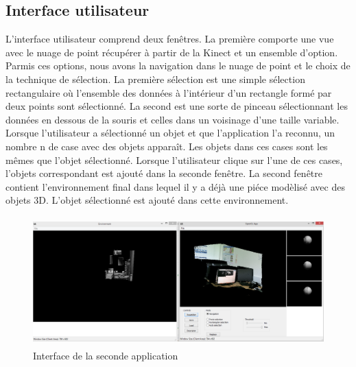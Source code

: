 \subsection{Interface utilisateur}
L'interface utilisateur comprend deux fenêtres. La première comporte une vue avec le nuage de point récupérer à partir de la Kinect
et un ensemble d'option. Parmis ces options, nous avons la navigation dans le nuage de point et le choix de la technique de 
sélection. La première sélection est une simple sélection rectangulaire où l'ensemble des données à l'intérieur d'un rectangle formé
par deux points sont sélectionné. La second est une sorte de pinceau sélectionnant les données en dessous de la souris et celles dans 
un voisinage d'une taille variable. Lorsque l'utilisateur a sélectionné un objet et que l'application l'a reconnu, un nombre n de case 
avec des objets apparaît. Les objets dans ces cases sont les mêmes que l'objet sélectionné. Lorsque l'utilisateur clique sur l'une 
de ces cases, l'objets correspondant est ajouté dans la seconde fenêtre.
La second fenêtre contient l'environnement final dans lequel il y a déjà une piéce modèlisé avec des objets 3D. L'objet sélectionné est 
ajouté dans cette environnement.

\begin{figure}[!h]
  \begin{center}
    \includegraphics[height=5cm]{image/appliObjet.PNG}
    \caption{Interface de la seconde application}
  \end{center}
\end{figure}
